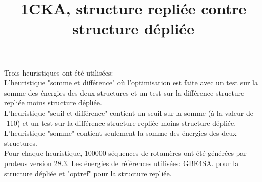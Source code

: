 \documentclass[a4paper,12pt]{article}
\title{1CKA, structure repliée contre structure dépliée} %
\begin{document}
\maketitle %


    Trois heuristiques ont été utilisées:\\
    L'heuristique "somme et différence" où l'optimisation est faite avec un test sur la somme des énergies des deux structures et un test sur la différence structure repliée moins structure dépliée.\\ 
    L'heuristique "seuil et différence" contient un seuil sur la somme (à la valeur de -110) et un test sur la différence structure repliée moins structure dépliée.\\
    L'heuristique "somme" contient seulement la somme des énergies des deux structures.\\

    Pour chaque heuristique, 100000 séquences de rotamères ont été générées par proteus version 28.3.
    Les énergies de références utilisées: GBE4SA. pour la structure dépliée et "optref" pour la structure repliée. 
        
\end{document}
